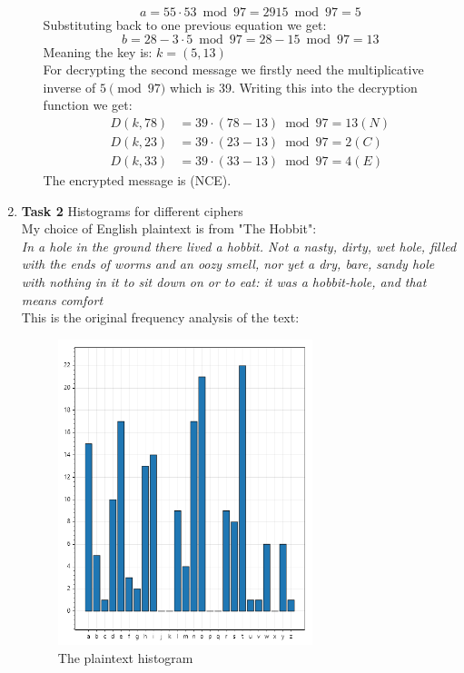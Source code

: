 \documentclass{article}
\begin{document}
\begin{enumerate}[label={}]
\begin{enumerate}
		\[a = 55 \cdot 53 \bmod 97 = 2915 \bmod 97 = 5\]
		Substituting back to one previous equation we get:
		\[b = 28 - 3 \cdot 5 \bmod 97 = 28 -15 \bmod 97 = 13\]
		Meaning the key is: $k = (5, 13)$\\
		For decrypting the second message we firstly need the multiplicative inverse of $5 \pmod 97$ which is 39. Writing this into the decryption function we get:
		\begin{align*}
			D(k, 78) &= 39 \cdot (78 - 13) \bmod 97 = 13 (N)\\
			D(k, 23) &= 39 \cdot (23 - 13) \bmod 97 = 2 (C)\\
			D(k, 33) &= 39 \cdot (33 - 13) \bmod 97 = 4 (E)
		\end{align*}
		The encrypted message is (NCE).
	\end{enumerate}
	\item \textbf{Task 2} Histograms for different ciphers\\
		My choice of English plaintext is from "The Hobbit":\\
		\textit{In a hole in the ground there lived a hobbit. Not a nasty, dirty, wet hole, filled with the ends of worms and an oozy smell, nor yet a dry, bare, sandy hole with nothing in it to sit down on or to eat: it was a hobbit-hole, and that means comfort}\\
		This is the original frequency analysis of the text:
		\begin{figure}[H]
			\centering
			\includegraphics[width=0.7\textwidth]{original.png}
			\caption{The plaintext histogram}

\end{figure}
\end{enumerate}
\end{document}
